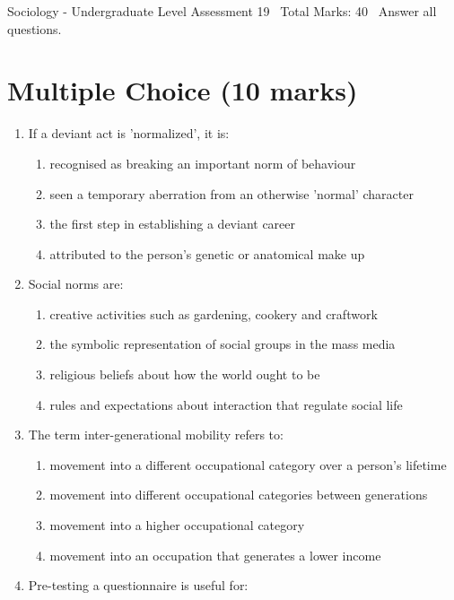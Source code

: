 \documentclass[12pt]{article}
\begin{document}
\begin{center}
Sociology - Undergraduate Level Assessment 19 \
Total Marks: 40 \
Answer all questions.
\end{center}

\section*{Multiple Choice (10 marks)}
\begin{enumerate}[label=\arabic*.]
\item If a deviant act is 'normalized', it is:
\begin{enumerate}[label=(\alph*)]
    \item recognised as breaking an important norm of behaviour
    \item seen a temporary aberration from an otherwise 'normal' character
    \item the first step in establishing a deviant career
    \item attributed to the person's genetic or anatomical make up
\end{enumerate}
\item Social norms are:
\begin{enumerate}[label=(\alph*)]
    \item creative activities such as gardening, cookery and craftwork
    \item the symbolic representation of social groups in the mass media
    \item religious beliefs about how the world ought to be
    \item rules and expectations about interaction that regulate social life
\end{enumerate}
\item The term inter-generational mobility refers to:
\begin{enumerate}[label=(\alph*)]
    \item movement into a different occupational category over a person's lifetime
    \item movement into different occupational categories between generations
    \item movement into a higher occupational category
    \item movement into an occupation that generates a lower income
\end{enumerate}
\item Pre-testing a questionnaire is useful for:
\begin{enumerate}[label=(\alph*)]

\end{enumerate}
\end{enumerate}
\end{document}

